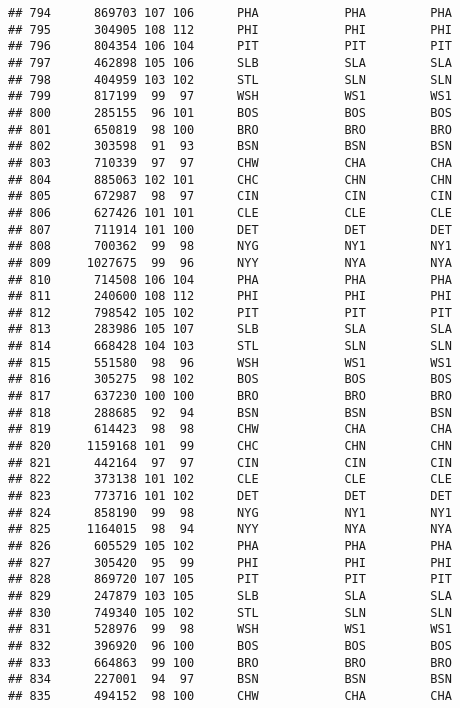\documentclass[]{article}
\begin{document}
\begin{verbatim}
## 794      869703 107 106      PHA            PHA         PHA
## 795      304905 108 112      PHI            PHI         PHI
## 796      804354 106 104      PIT            PIT         PIT
## 797      462898 105 106      SLB            SLA         SLA
## 798      404959 103 102      STL            SLN         SLN
## 799      817199  99  97      WSH            WS1         WS1
## 800      285155  96 101      BOS            BOS         BOS
## 801      650819  98 100      BRO            BRO         BRO
## 802      303598  91  93      BSN            BSN         BSN
## 803      710339  97  97      CHW            CHA         CHA
## 804      885063 102 101      CHC            CHN         CHN
## 805      672987  98  97      CIN            CIN         CIN
## 806      627426 101 101      CLE            CLE         CLE
## 807      711914 101 100      DET            DET         DET
## 808      700362  99  98      NYG            NY1         NY1
## 809     1027675  99  96      NYY            NYA         NYA
## 810      714508 106 104      PHA            PHA         PHA
## 811      240600 108 112      PHI            PHI         PHI
## 812      798542 105 102      PIT            PIT         PIT
## 813      283986 105 107      SLB            SLA         SLA
## 814      668428 104 103      STL            SLN         SLN
## 815      551580  98  96      WSH            WS1         WS1
## 816      305275  98 102      BOS            BOS         BOS
## 817      637230 100 100      BRO            BRO         BRO
## 818      288685  92  94      BSN            BSN         BSN
## 819      614423  98  98      CHW            CHA         CHA
## 820     1159168 101  99      CHC            CHN         CHN
## 821      442164  97  97      CIN            CIN         CIN
## 822      373138 101 102      CLE            CLE         CLE
## 823      773716 101 102      DET            DET         DET
## 824      858190  99  98      NYG            NY1         NY1
## 825     1164015  98  94      NYY            NYA         NYA
## 826      605529 105 102      PHA            PHA         PHA
## 827      305420  95  99      PHI            PHI         PHI
## 828      869720 107 105      PIT            PIT         PIT
## 829      247879 103 105      SLB            SLA         SLA
## 830      749340 105 102      STL            SLN         SLN
## 831      528976  99  98      WSH            WS1         WS1
## 832      396920  96 100      BOS            BOS         BOS
## 833      664863  99 100      BRO            BRO         BRO
## 834      227001  94  97      BSN            BSN         BSN
## 835      494152  98 100      CHW            CHA         CHA

\end{verbatim}
\end{document}
